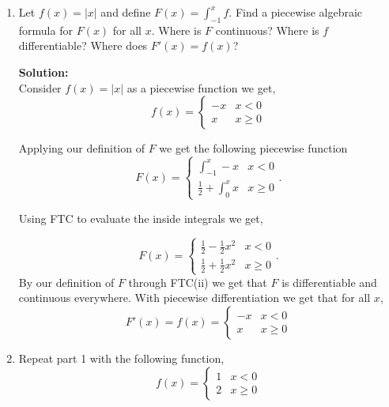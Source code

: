\documentclass[12pt]{article}
\makeatletter
\theoremstyle{homework}
\newenvironment{exercise}[1]
{\def\@currentlabel{#1}\exercisecore}
{\endexercisecore}
\newcommand{\localhead}[1]{\par\smallskip\noindent\textbf{#1}\nobreak\\}%
\newcommand\solution{\localhead{Solution:}}
\makeatother
\begin{document}
\begin{exercise}{Abbott 7.5.1}
	\begin{enumerate}
		\item Let $f(x) = |x|$ and define $F(x) = \int_{-1}^x f$. Find a piecewise algebraic formula for $F(x)$ for all $x$.
		Where is $F$ continuous? Where is $f$ differentiable? Where does $F'(x) = f(x)$? \\
		
		\solution Consider $f(x) = |x|$ as a piecewise function we get,
		\begin{equation*}
			f(x) = 
			 \begin{cases} 
				-x & x < 0 \\
				x & x \geq 0
			 \end{cases}
		\end{equation*}	

	Applying our definition of $F$ we get the following piecewise function\\
	\begin{equation*}
		F(x) = 
	 \begin{cases} 
			\int_{-1}^x -x & x < 0 \\
			\frac{1}{2} + \int_{0}^x x & x \geq 0
		 \end{cases}.
	\end{equation*}

	Using FTC to evaluate the inside integrals we get,
	
	\begin{equation*}
		F(x) = 
		 \begin{cases} 
			\frac{1}{2} - \frac{1}{2}x^2 & x < 0 \\
			\frac{1}{2} + \frac{1}{2}x^2 & x \geq 0
		 \end{cases}.
	\end{equation*}
	By our definition of $F$ through FTC(ii) we get that $F$ is differentiable and continuous everywhere. 
	With piecewise differentiation we get that for all $x$,
	\begin{equation*}
		F'(x) = f(x) = 
		\begin{cases} 
		   -x & x < 0 \\
		   x & x \geq 0
		\end{cases}
	\end{equation*}
	\vspace{.25in}


	\item Repeat part 1 with the following function,
	\begin{equation*}
		f(x) = 
		 \begin{cases} 
			1 & x < 0 \\
			2 & x \geq 0
		 \end{cases}
	\end{equation*}	


\end{enumerate}
\end{exercise}
\end{document}
